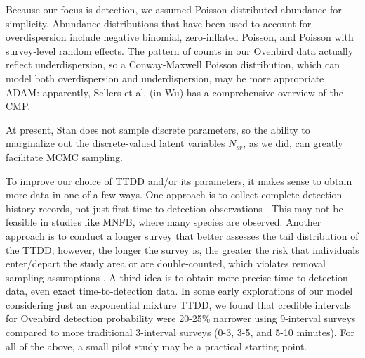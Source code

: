 \documentclass[useAMS,usenatbib,referee,12pt]{article}
\newcommand{\adam}[1]{{\color{blue} ADAM: #1}}
\begin{document}
Because our focus is detection, we assumed Poisson-distributed abundance for simplicity.  Abundance distributions that have been used to account for overdispersion include negative binomial, zero-inflated Poisson, and Poisson with survey-level random effects.  The pattern of counts in our Ovenbird data actually reflect underdispersion, so a Conway-Maxwell Poisson distribution, which can model both overdispersion and underdispersion, may be more appropriate \citep{Wu2015}\adam{apparently, Sellers et al. (in Wu) has a comprehensive overview of the CMP.}



At present, Stan does not sample discrete parameters, so the ability to marginalize out the discrete-valued latent variables $N_{sr}$, as we did, can greatly facilitate MCMC sampling.





To improve our choice of TTDD and/or its parameters, it makes sense to obtain more data in one of a few ways.  One approach is to collect complete detection history records, not just first time-to-detection observations \citep{Alldredge2007}.  This may not be feasible in studies like MNFB, where many species are observed.  Another approach is to conduct a longer survey that better assesses the tail distribution of the TTDD; however, the longer the survey is, the greater the risk that individuals enter/depart the study area or are double-counted, which violates removal sampling assumptions \citep{LeeMarsden2008, Reidy2011}.  A third idea is to obtain more precise time-to-detection data, even exact time-to-detection data.  In some early explorations of our model considering just an exponential mixture TTDD, we found that credible intervals for Ovenbird detection probability were 20-25\% narrower using 9-interval surveys compared to more traditional 3-interval surveys (0-3, 3-5, and 5-10 minutes).  For all of the above, a small pilot study may be a practical starting point.  
\end{document}
